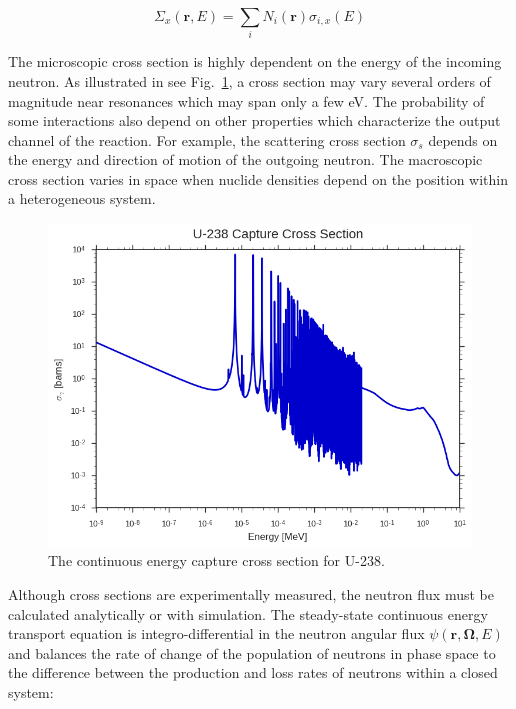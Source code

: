 \begin{dmath}
\label{eqn:chap2-macro-xs-sum}
\Sigma_{x}(\mathbf{r},E) = \sum_{i}N_{i}(\mathbf{r})\sigma_{i,x}(E)
\end{dmath}

The microscopic cross section is highly dependent on the energy of the incoming neutron. As illustrated in see Fig.~\ref{fig:chap2-u238-xs}, a cross section may vary several orders of magnitude near resonances which may span only a few eV. The probability of some interactions also depend on other properties which characterize the output channel of the reaction. For example, the scattering cross section $\sigma_{s}$ depends on the energy and direction of motion of the outgoing neutron. The macroscopic cross section varies in space when nuclide densities depend on the position within a heterogeneous system.


\begin{figure}[H]
  \centering
  \includegraphics[width=0.8\linewidth]{figures/mgxs/u238-capture-xs}
\caption[U-238 capture cross section]{The continuous energy capture cross section for U-238.}
\label{fig:chap2-u238-xs}
\end{figure}
 
Although cross sections are experimentally measured, the neutron flux must be calculated analytically or with simulation. The steady-state continuous energy transport equation is integro-differential in the neutron angular flux $\psi(\mathbf{r},\mathbf{\Omega},E)$ and balances the rate of change of the population of neutrons in phase space to the difference between the production and loss rates of neutrons within a closed system:

